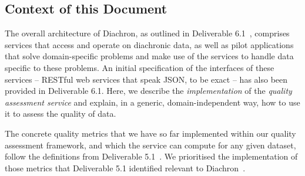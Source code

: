 
\subsection{Context of this Document}
\label{sec:ContextDoc} 

The overall architecture of Diachron, as outlined in Deliverable 6.1~\cite{diachron-d6.1}, comprises services that access and operate on diachronic data, as well as pilot applications that solve domain-specific problems and make use of the services to handle data specific to these problems.  An initial specification of the interfaces of these services – RESTful web services that speak JSON, to be exact – has also been provided in Deliverable 6.1.  Here, we describe the \emph{implementation} of the \emph{quality assessment service} and explain, in a generic, domain-independent way, how to use it to assess the quality of data.

The concrete quality metrics that we have so far implemented within our quality assessment framework, and which the service can compute for any given dataset, follow the definitions from Deliverable 5.1~\cite{diachron-d5.1}.
We prioritised the implementation of those metrics that Deliverable 5.1 identified relevant to Diachron~\cite[section~4]{diachron-d5.1}.



